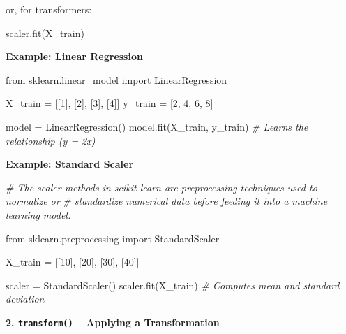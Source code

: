 \documentclass{article}
\newenvironment{Shaded}{}{}
\newcommand{\DecValTok}[1]{\textcolor[rgb]{0.25,0.63,0.44}{{#1}}}
\newcommand{\CommentTok}[1]{\textcolor[rgb]{0.38,0.63,0.69}{\textit{{#1}}}}
\newcommand{\NormalTok}[1]{{#1}}
\newcommand{\ImportTok}[1]{{#1}}
\newcommand{\OperatorTok}[1]{\textcolor[rgb]{0.40,0.40,0.40}{{#1}}}
\begin{document}
or, for transformers:

\begin{Shaded}
\begin{Highlighting}[]
\NormalTok{scaler.fit(X\_train)}
\end{Highlighting}
\end{Shaded}

\textbf{Example: Linear Regression}

\begin{Shaded}
\begin{Highlighting}[]
\ImportTok{from}\NormalTok{ sklearn.linear\_model }\ImportTok{import}\NormalTok{ LinearRegression}

\NormalTok{X\_train }\OperatorTok{=}\NormalTok{ [[}\DecValTok{1}\NormalTok{], [}\DecValTok{2}\NormalTok{], [}\DecValTok{3}\NormalTok{], [}\DecValTok{4}\NormalTok{]]}
\NormalTok{y\_train }\OperatorTok{=}\NormalTok{ [}\DecValTok{2}\NormalTok{, }\DecValTok{4}\NormalTok{, }\DecValTok{6}\NormalTok{, }\DecValTok{8}\NormalTok{]}

\NormalTok{model }\OperatorTok{=}\NormalTok{ LinearRegression()}
\NormalTok{model.fit(X\_train, y\_train)  }\CommentTok{\# Learns the relationship (y = 2x)}
\end{Highlighting}
\end{Shaded}

\textbf{Example: Standard Scaler}

\begin{Shaded}
\begin{Highlighting}[]
\CommentTok{\# The scaler methods in scikit{-}learn are preprocessing techniques used to normalize or }
\CommentTok{\# standardize numerical data before feeding it into a machine learning model.}

\ImportTok{from}\NormalTok{ sklearn.preprocessing }\ImportTok{import}\NormalTok{ StandardScaler}

\NormalTok{X\_train }\OperatorTok{=}\NormalTok{ [[}\DecValTok{10}\NormalTok{], [}\DecValTok{20}\NormalTok{], [}\DecValTok{30}\NormalTok{], [}\DecValTok{40}\NormalTok{]]}

\NormalTok{scaler }\OperatorTok{=}\NormalTok{ StandardScaler()}
\NormalTok{scaler.fit(X\_train)  }\CommentTok{\# Computes mean and standard deviation}
\end{Highlighting}
\end{Shaded}

\textbf{2. \texttt{transform()} -- Applying a Transformation}
\end{document}
